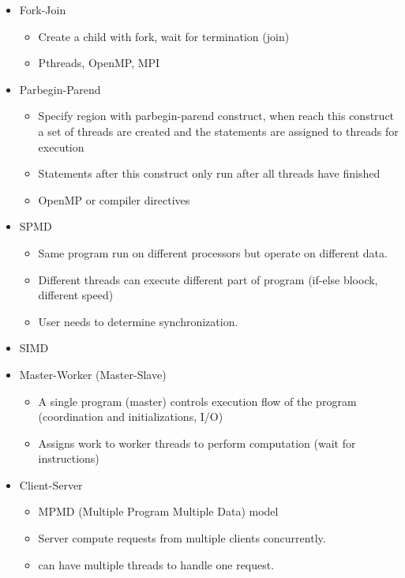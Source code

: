 \documentclass{article}
\begin{document}
\begin{itemize}
    \item Fork-Join
          \begin{itemize}
              \item Create a child with fork, wait for termination (join)
              \item Pthreads, OpenMP, MPI
          \end{itemize}
    \item Parbegin-Parend
          \begin{itemize}
              \item Specify region with parbegin-parend construct, when reach this construct a set of threads are created and the statements are assigned to threads for execution
              \item Statements after this construct only run after all threads have finished
              \item OpenMP or compiler directives
          \end{itemize}
    \item SPMD
          \begin{itemize}
              \item Same program run on different processors but operate on different data.
              \item Different threads can execute different part of program (if-else bloock, different speed)
              \item User needs to determine synchronization.
          \end{itemize}
    \item SIMD
    \item Master-Worker (Master-Slave)
          \begin{itemize}
              \item A single program (master) controls execution flow of the program (coordination and initializations, I/O)
              \item Assigns work to worker threads to perform computation (wait for instructions)
          \end{itemize}
    \item Client-Server
          \begin{itemize}
              \item MPMD (Multiple Program Multiple Data) model
              \item Server compute requests from multiple clients concurrently.
              \item can have multiple threads to handle one request.

\end{itemize}
\end{itemize}
\end{document}
